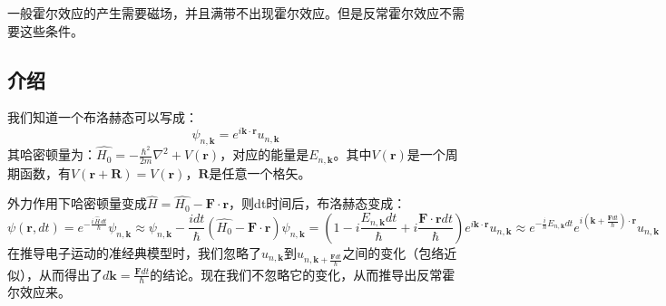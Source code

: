 \begin{issues}
\issueDraft
\end{issues}
一般霍尔效应的产生需要磁场，并且满带不出现霍尔效应。但是反常霍尔效应不需要这些条件。
\subsection{介绍}
我们知道一个布洛赫态可以写成：
\begin{equation}
\psi_{n,\boldsymbol{k}}=e^{i\boldsymbol{k}\cdot\boldsymbol{r}}u_{n,\boldsymbol{k}}
\end{equation}
其哈密顿量为：$\widehat{H_0}=-\frac{\hbar^2}{2m}\nabla^2+V(\boldsymbol{r})$，对应的能量是$E_{n,\boldsymbol{k}}$。其中$V(\boldsymbol{r})$是一个周期函数，有$V(\boldsymbol{r}+\boldsymbol{R})=V(\boldsymbol{r})$，$\boldsymbol{R}$是任意一个格矢。

外力作用下哈密顿量变成$\widehat{H}=\widehat{H_0}-\boldsymbol{F}\cdot\boldsymbol{r}$，则dt时间后，布洛赫态变成：
\begin{equation}
\psi(\boldsymbol{r},dt)=e^{-\frac{i\,\widehat{H}\,dt}{\hbar}}\psi_{n,\boldsymbol{k}} \approx \psi_{n,\boldsymbol{k}}-\frac{idt}{\hbar}(\widehat{H_0}-\boldsymbol{F}\cdot\boldsymbol{r})\psi_{n,\boldsymbol{k}}
=(1-i\frac{E_{n,\boldsymbol{k}}dt}{\hbar}+i\frac{\boldsymbol{F}\cdot\boldsymbol{r}dt}{\hbar})e^{i\boldsymbol{k}\cdot\boldsymbol{r}}u_{n,\boldsymbol{k}}
\approx e^{-\frac{i}{\hbar}E_{n,\boldsymbol{k}}dt}e^{i(\boldsymbol{k}+\frac{\boldsymbol{F}dt}{\hbar})\cdot \boldsymbol{r}}u_{n,\boldsymbol{k}}
\end{equation}
在推导电子运动的准经典模型时，我们忽略了$u_{n,\boldsymbol{k}}$到$u_{n,\boldsymbol{k}+\frac{\boldsymbol{F}dt}{\hbar}}$之间的变化（包络近似），从而得出了$d\boldsymbol{k}=\frac{\boldsymbol{F}dt}{\hbar}$的结论。现在我们不忽略它的变化，从而推导出反常霍尔效应来。

